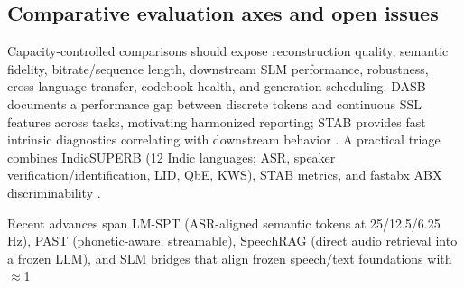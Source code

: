 \documentclass{article}
\begin{document}
\subsection{Comparative evaluation axes and open issues} \label{subsec:comparativeevaluationaxesandopenissues}
Capacity-controlled comparisons should expose reconstruction quality, semantic fidelity, bitrate/sequence length, downstream SLM performance, robustness, cross-language transfer, codebook health, and generation scheduling. DASB documents a performance gap between discrete tokens and continuous SSL features across tasks, motivating harmonized reporting; STAB provides fast intrinsic diagnostics correlating with downstream behavior \cite{mousavi2024dasbdiscreteaudiospeechbenchmark,vashishth2024stabspeechtokenizerassessmentbenchmark}. A practical triage combines IndicSUPERB (12 Indic languages; ASR, speaker verification/identification, LID, QbE, KWS), STAB metrics, and fastabx ABX discriminability \cite{vashishth2024stabspeechtokenizerassessmentbenchmark,poli2025fastabxlibraryefficientcomputationabxdis,entry2025indicsuperbspeechprocessinguniversalperf}.

Recent advances span LM-SPT (ASR-aligned semantic tokens at 25/12.5/6.25 Hz), PAST (phonetic-aware, streamable), SpeechRAG (direct audio retrieval into a frozen LLM), and SLM bridges that align frozen speech/text foundations with $\approx$1%
\end{document}
